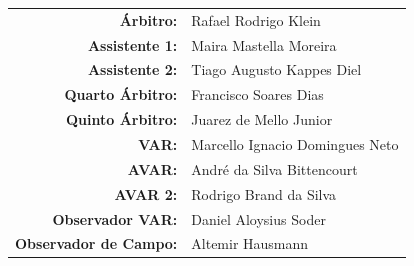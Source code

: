 \documentclass[11pt]{article}
\begin{document}
\vspace{0.5cm}
\begin{minipage}{0.65\textwidth}
\begin{center}
\begin{tabular}{rl}
\textbf{Árbitro:} & Rafael Rodrigo Klein \\
\textbf{Assistente 1:} & Maira Mastella Moreira \\
\textbf{Assistente 2:} & Tiago Augusto Kappes Diel \\
\textbf{Quarto Árbitro:} & Francisco Soares Dias \\
\textbf{Quinto Árbitro:} & Juarez de Mello Junior \\
\textbf{VAR:} & Marcello Ignacio Domingues Neto \\
\textbf{AVAR:} & André da Silva Bittencourt \\
\textbf{AVAR 2:} & Rodrigo Brand da Silva \\
\textbf{Observador VAR:} & Daniel Aloysius Soder \\
\textbf{Observador de Campo:} & Altemir Hausmann \\
\end{tabular}
\end{center}
\end{minipage}
\begin{minipage}{0.3\textwidth}
\end{minipage}
\newpage
\end{document}

